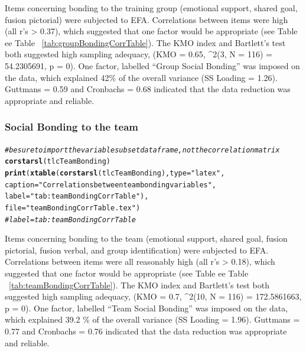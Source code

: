 \documentclass[english]{article}\usepackage[]{graphicx}\usepackage[]{color}
\makeatletter
\newcommand{\hlstr}[1]{\textcolor[rgb]{0.192,0.494,0.8}{#1}}%
\newcommand{\hlcom}[1]{\textcolor[rgb]{0.678,0.584,0.686}{\textit{#1}}}%
\newcommand{\hlstd}[1]{\textcolor[rgb]{0.345,0.345,0.345}{#1}}%
\newcommand{\hlkwc}[1]{\textcolor[rgb]{0.333,0.667,0.333}{#1}}%
\newcommand{\hlkwd}[1]{\textcolor[rgb]{0.737,0.353,0.396}{\textbf{#1}}}%
\newenvironment{kframe}{%
 \def\at@end@of@kframe{}%
 \ifinner\ifhmode%
  \def\at@end@of@kframe{\end{minipage}}%
  \begin{minipage}{\columnwidth}%
 \fi\fi%
 \def\FrameCommand##1{\hskip\@totalleftmargin \hskip-\fboxsep
 \colorbox{shadecolor}{##1}\hskip-\fboxsep
     \hskip-\linewidth \hskip-\@totalleftmargin \hskip\columnwidth}%
 \MakeFramed {\advance\hsize-\width
   \@totalleftmargin\z@ \linewidth\hsize
   \@setminipage}}%
 {\par\unskip\endMakeFramed%
 \at@end@of@kframe}
\newenvironment{knitrout}{}{} %
\makeatother
\begin{document}
Items concerning bonding to the training group (emotional support, shared goal, fusion pictorial) were subjected to EFA.  Correlations between items were high (all r's > 0.37), which suggested that one factor would be appropriate (see Table ee Table ~\ref{tab:groupBondingCorrTable}). The KMO index and Bartlett's test both suggested high sampling adequacy, (KMO =  0.65, \chi^2(3, N = 116) = 54.2305691, p = 0).
One factor, labelled ``Group Social Bonding'' was imposed on the data, which explained 42\% of the overall variance (SS Loading = 1.26). Guttmans \lambda = 0.59 and Cronbachs \alpha = 0.68 indicated that the data reduction was appropriate and reliable.



\subsubsection{Social Bonding to the team}



\begin{knitrout}
\color{fgcolor}\begin{kframe}
\begin{alltt}
\hlcom{# be sure to import the variable subset data frame, not the correlation matrix}
\hlkwd{corstarsl}\hlstd{(tlcTeamBonding)}
\hlkwd{print}\hlstd{(}\hlkwd{xtable}\hlstd{(}\hlkwd{corstarsl}\hlstd{(tlcTeamBonding),} \hlkwc{type}\hlstd{=}\hlstr{"latex"}\hlstd{,}
                    \hlkwc{caption} \hlstd{=} \hlstr{"Correlations between team bonding variables"}\hlstd{,}
                    \hlkwc{label} \hlstd{=} \hlstr{"tab:teamBondingCorrTable"}\hlstd{),}
                    \hlkwc{file} \hlstd{=} \hlstr{"teamBondingCorrTable.tex"}\hlstd{)}
\hlcom{# label = tab:teamBondingCorrTable}
\end{alltt}
\end{kframe}
\end{knitrout}



Items concerning bonding to the team (emotional support, shared goal, fusion pictorial, fusion verbal, and group identification) were subjected to EFA.  Correlations between items were all reasonably high (all r's > 0.18), which suggested that one factor would be appropriate (see Table ee Table ~\ref{tab:teamBondingCorrTable}). 
The KMO index and Bartlett's test both suggested high sampling adequacy, (KMO =  0.7, \chi^2(10, N = 116) = 172.5861663, p = 0).
One factor, labelled ``Team Social Bonding'' was imposed on the data, which explained 39.2 \% of the overall variance (SS Loading = 1.96). Guttmans \lambda = 0.77 and Cronbachs \alpha = 0.76 indicated that the data reduction was appropriate and reliable.
\end{document}
